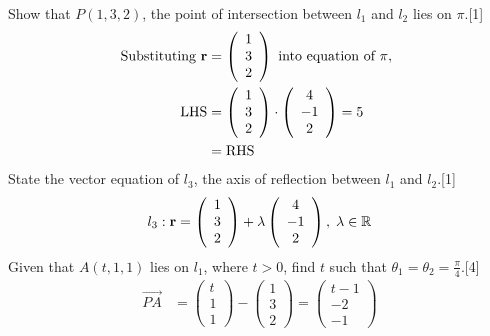 \documentclass[12pt, a4 paper]{article}
\begin{document}
\begin{outline}[enumerate]
\begin{align*}
					\end{align*}
					\color{black}
					\2	Show that $P(1,3,2)$, the point of intersection between ${l_1}$ and ${l_2}$ lies on $\pi $.\hfill[1]
					\color{blue}
					\begin{align*}
						{\textrm{Substituting }}{\bf{r}} & = \left( {\begin{array}{*{20}{c}}1 \\3\\2\end{array}} \right){\textrm{ into equation of }}\pi ,{\textrm{ }}\\{\textrm{LHS}} &= \left( {\begin{array}{*{20}{c}}1\\3\\2\end{array}} \right) \cdot \left( {\begin{array}{*{20}{c}}4\\{ - 1}\\2\end{array}} \right) = 5\\ 
						&= {\textrm{RHS}}
					\end{align*}
					\color{black}
					\2	State the vector equation of ${l_3}$, the axis of reflection between ${l_1}$ and ${l_2}$.\hfill[1]	
					\color{blue}
					\begin{equation*}
						{l_3}:{\bf{r}} = \left( {\begin{array}{*{20}{c}}1 \\3\\2\end{array}} \right) + \lambda \left( {\begin{array}{*{20}{c}}4\\{ - 1}\\2\end{array}} \right),\;\lambda  \in \mathbb{R}
					\end{equation*}
					\color{black}
					\2	Given that $A(t,1,1)$ lies on ${l_1}$, where $t > 0$, find $t$ such that ${\theta _1} = {\theta _2} = \frac{\pi }{4}$.\hfill[4]
					\color{blue}
					\begin{align*}
						\overrightarrow {PA} & = \left( {\begin{array}{*{20}{c}}t \\1\\1\end{array}} \right) - \left( {\begin{array}{*{20}{c}}1\\3\\2\end{array}} \right) = \left( {\begin{array}{*{20}{c}}{t - 1}\\{ - 2}\\{ - 1}\end{array}} \right)

\end{align*}
\end{outline}
\end{document}
